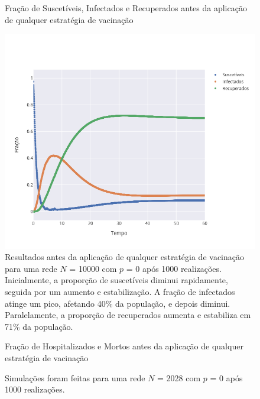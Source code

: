 \begin{figure}[H]
    \centering
    \captionsetup{font=normalsize,skip=0.8pt,singlelinecheck=on,labelsep=endash}
    \caption{Fração de Suscetíveis, Infectados e Recuperados antes da aplicação de qualquer estratégia de vacinação}
    \includegraphics[scale= 0.5]{figuras/pre_vacina.png}
    \captionsetup{font=small,justification=justified}
    \caption*{Resultados antes da aplicação de qualquer 
    estratégia de vacinação para uma rede $N$ = 10000 com $p $ = 0 após 1000 realizações. Inicialmente, a proporção de suscetíveis diminui rapidamente, seguida por um aumento e estabilização. A fração de infectados atinge um pico, afetando 
    40\% da população, e depois diminui. Paralelamente, a proporção de recuperados aumenta e estabiliza em 71\% da população.}
    \label{fig:pre_vacina}
\end{figure}

\begin{figure}[H]
    \centering
    \captionsetup{font=normalsize,skip=0.8pt,singlelinecheck=on,labelsep=endash}
    \caption{Fração de Hospitalizados e Mortos antes da aplicação de qualquer estratégia de vacinação}
    \captionsetup{font=small,justification=justified}
    \caption*{Simulações foram feitas para uma rede $N$ = 2028 com $p $ = 0 após 1000 realizações.}
    \label{fig:pre_vacina_mortos}
\end{figure}

